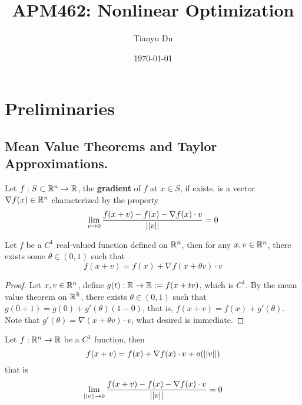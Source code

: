 \documentclass{article}
\title{APM462: Nonlinear Optimization}
\date{\today}
\author{Tianyu Du}
\begin{document}
    \maketitle
    \tableofcontents
    \newpage
    
    \section{Preliminaries}
    \subsection{Mean Value Theorems and Taylor Approximations.}
    \begin{definition}
        Let $f: S \subset \mathbb{R}^n \to \mathbb{R}$, the \textbf{gradient} of $f$ at $x \in S$, if exists, is a vector $\nabla f(x) \in \mathbb{R}^n$ characterized by the property
        \begin{equation}
            \lim_{v \to 0} \frac{f(x+v) - f(x) - \nabla f(x) \cdot v}{\vert \vert {v} \vert \vert} = 0
        \end{equation}
    \end{definition}
    
    \begin{theorem}
        Let $f$ be a $C^1$ real-valued function defined on $\mathbb{R}^n$, then for any $x, v \in \mathbb{R}^n$, there exists some $\theta \in (0, 1)$ such that
        \begin{equation}
            f(x + v) = f(x) + \nabla f(x + \theta v) \cdot v
        \end{equation}
    \end{theorem}
    
    \begin{proof}
        Let $x, v \in \mathbb{R}^n$, define $g(t): \mathbb{R} \to \mathbb{R} := f(x + tv)$, which is $C^1$. By the mean value theorem on $\mathbb{R}^{\mathbb{R}}$, there exists $\theta \in (0, 1)$ such that $g(0+1) = g(0) + g'(\theta)(1-0)$, that is, $f(x+v) = f(x) + g'(\theta)$. Note that $g'(\theta) = \nabla(x + \theta v) \cdot v$, what desired is immediate.
    \end{proof}
    
    \begin{proposition}
        Let $f: \mathbb{R}^n \to \mathbb{R}$ be a $C^1$ function, then
        \begin{equation}
            f(x + v) = f(x) + \nabla f(x) \cdot v + o(\vert \vert {v} \vert \vert)
        \end{equation}
        that is
        \begin{equation}
            \lim_{\vert \vert {v} \vert \vert \to 0} \frac{f(x + v) - f(x) - \nabla f(x) \cdot v}{\vert \vert {v} \vert \vert} = 0
        \end{equation}
    \end{proposition}
    
\end{document}
